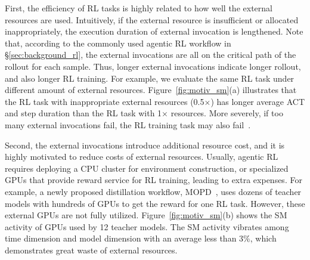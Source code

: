 

First, the efficiency of RL tasks is highly related to how well the external resources are used.
Intuitively, if the external resource is insufficient or allocated inappropriately, the execution duration of external invocation is lengthened.
Note that, according to the commonly used agentic RL workflow in \S\ref{sec:background_rl}, the external invocations are all on the critical path of the rollout for each sample.
Thus, longer external invocations indicate longer rollout, and also longer RL training.
For example, we evaluate the same RL task under different amount of external resources.
Figure~\ref{fig:motiv_sm}(a) illustrates that the RL task with inappropriate external resources (0.5$\times$) has longer average ACT and step duration than the RL task with 1$\times$ resources.
More severely, if too many external invocations fail, the RL training task may also fail~\citep{jiang2025verltool}.

Second, the external invocations introduce additional resource cost, and it is highly motivated to reduce costs of external resources.
Usually, agentic RL requires deploying a CPU cluster for environment construction, or specialized GPUs that provide reward service for RL training, leading to extra expenses.
For example, a newly proposed distillation workflow, MOPD~\citep{xiao2026mimo}, uses dozens of teacher models with hundreds of GPUs to get the reward for one RL task.
However, these external GPUs are not fully utilized.
Figure~\ref{fig:motiv_sm}(b) shows the SM activity of GPUs used by 12 teacher models.
The SM activity vibrates among time dimension and model dimension with an average less than 3\%,
which demonstrates great waste of external resources.


